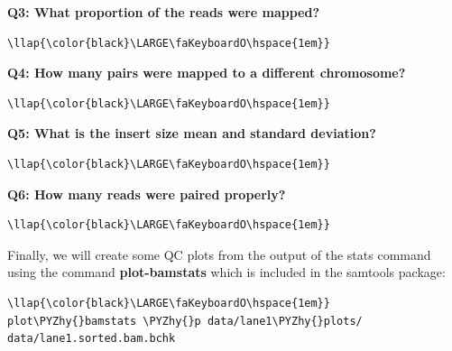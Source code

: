 \documentclass[11pt]{article}
\def\PYZhy{\char`\-}
\begin{document}
    \textbf{Q3: What proportion of the reads were mapped?}

\begin{terminalinput}
\begin{Verbatim}[commandchars=\\\{\}]
\llap{\color{black}\LARGE\faKeyboardO\hspace{1em}}
\end{Verbatim}
\end{terminalinput}

    \textbf{Q4: How many pairs were mapped to a different chromosome?}

\begin{terminalinput}
\begin{Verbatim}[commandchars=\\\{\}]
\llap{\color{black}\LARGE\faKeyboardO\hspace{1em}}
\end{Verbatim}
\end{terminalinput}

    \textbf{Q5: What is the insert size mean and standard deviation?}

\begin{terminalinput}
\begin{Verbatim}[commandchars=\\\{\}]
\llap{\color{black}\LARGE\faKeyboardO\hspace{1em}}
\end{Verbatim}
\end{terminalinput}

    \textbf{Q6: How many reads were paired properly?}

\begin{terminalinput}
\begin{Verbatim}[commandchars=\\\{\}]
\llap{\color{black}\LARGE\faKeyboardO\hspace{1em}}
\end{Verbatim}
\end{terminalinput}

    Finally, we will create some QC plots from the output of the stats
command using the command \textbf{plot-bamstats} which is included in
the samtools package:

\begin{terminalinput}
\begin{Verbatim}[commandchars=\\\{\}]
\llap{\color{black}\LARGE\faKeyboardO\hspace{1em}} plot\PYZhy{}bamstats \PYZhy{}p data/lane1\PYZhy{}plots/ data/lane1.sorted.bam.bchk
\end{Verbatim}
\end{terminalinput}
\end{document}
